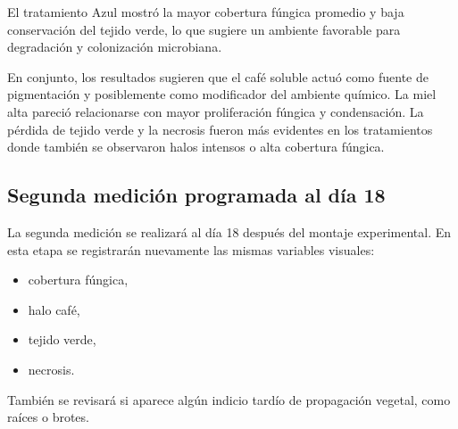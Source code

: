 El tratamiento Azul mostró la mayor cobertura fúngica promedio y baja conservación del tejido verde, lo que sugiere un ambiente favorable para degradación y colonización microbiana.

En conjunto, los resultados sugieren que el café soluble actuó como fuente de pigmentación y posiblemente como modificador del ambiente químico. La miel alta pareció relacionarse con mayor proliferación fúngica y condensación. La pérdida de tejido verde y la necrosis fueron más evidentes en los tratamientos donde también se observaron halos intensos o alta cobertura fúngica.

\subsection{Segunda medición programada al día 18}

La segunda medición se realizará al día 18 después del montaje experimental. En esta etapa se registrarán nuevamente las mismas variables visuales:

\begin{itemize}
\item cobertura fúngica,
\item halo café,
\item tejido verde,
\item necrosis.
\end{itemize}

También se revisará si aparece algún indicio tardío de propagación vegetal, como raíces o brotes.

\begin{table}[H]
\centering
{}
\caption{Formato de registro para la segunda medición al día 18.}
\end{table}

